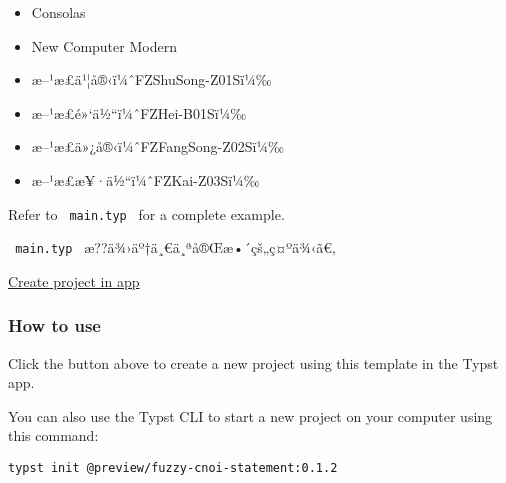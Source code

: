 \begin{itemize}
\tightlist
\item
  Consolas
\item
  New Computer Modern
\item
  æ--¹æ­£ä¹¦å®‹ï¼ˆFZShuSong-Z01Sï¼‰
\item
  æ--¹æ­£é»`ä½``ï¼ˆFZHei-B01Sï¼‰
\item
  æ--¹æ­£ä»¿å®‹ï¼ˆFZFangSong-Z02Sï¼‰
\item
  æ--¹æ­£æ¥·ä½``ï¼ˆFZKai-Z03Sï¼‰
\end{itemize}

\begin{Shaded}
\begin{Highlighting}[]

\NormalTok{)}





\end{Highlighting}
\end{Shaded}

Refer to \texttt{\ main.typ\ } for a complete example.

\texttt{\ main.typ\ } æ??ä¾›äº†ä¸€ä¸ªå®Œæ•´çš„ç¤ºä¾‹ã€‚

\href{/app?template=fuzzy-cnoi-statement&version=0.1.2}{Create project
in app}

\subsubsection{How to use}\label{how-to-use}

Click the button above to create a new project using this template in
the Typst app.

You can also use the Typst CLI to start a new project on your computer
using this command:

\begin{verbatim}
typst init @preview/fuzzy-cnoi-statement:0.1.2
\end{verbatim}

